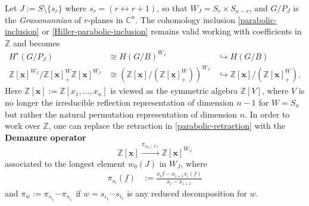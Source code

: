 \documentclass[12pt,dvips]{amsart}
\theoremstyle{plain}
\theoremstyle{definition}
\theoremstyle{remark}
\numberwithin{equation}{section}
\def\ZZ{{\mathbb Z}}
\def\CC{{\mathbb C}}
\def\xx{\mathbf{x}}
\begin{document}
  Let $J:=S\setminus\{s_r\}$ where $s_r=(r \leftrightarrow r+1)$, so that
$W_J=S_r \times S_{n-r}$, and $G/P_J$ is the
{\it Grassmannian} of $r$-planes in $\CC^n$.  
The cohomology inclusion \eqref{parabolic-inclusion} or
\eqref{Hiller-parabolic-inclusion} 
remains valid working with coefficients in $\ZZ$
and becomes
$$
\begin{array}{lll}
H^\star(G/P_J)   &\cong H(G/B)^{W_J} &\hookrightarrow H(G/B)\\
\ZZ[\xx]^{W_J}/\ZZ[\xx]^W_+ \ZZ[\xx]^{W_J} 
             &\cong \left( \ZZ[\xx]/(\ZZ[\xx]^W_+) \right)^{W_J} 
                                 &\hookrightarrow \ZZ[\xx]/(\ZZ[\xx]^W_+).
\end{array}
$$
Here $\ZZ[\xx]:=\ZZ[x_1,\ldots,x_n]$ is viewed as the symmetric algebra $\ZZ[V]$, where $V$ is 
no longer the irreducible reflection representation of dimension $n-1$ for $W=S_n$ 
but rather the
natural permutation representation of dimension $n$.  In order to work over $\ZZ$,
one can replace the retraction in \eqref{parabolic-retraction}
with the {\bf Demazure operator} 
$$
\ZZ[\xx] \overset{\pi_{w_0(J)}}{\longrightarrow} \ZZ[\xx]^{W_J}
$$
associated to the longest element $w_0(J)$ in $W_J$, where
$$
\begin{aligned}
\pi_{s_i}(f) &:=\frac{x_i f-x_{i+1} s_i(f)}{x_i-x_{i+1}} 
\end{aligned}
$$
and $\pi_w :=\pi_{s_{i_1}} \cdots \pi_{s_{i_\ell}}$
if $w=s_{i_1} \cdots s_{i_\ell}$ is any reduced decomposition for $w$.
\end{document}
